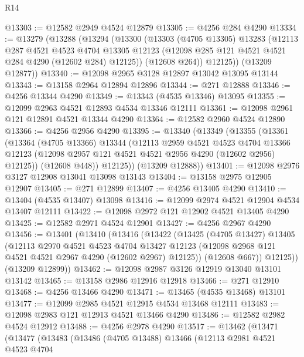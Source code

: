 \begin{lexlean}{R14}
\begin{coremodule}
@13303 := @12582 @2949 @4524 @12879
@13305 := @4256 @284 @4290
@13334 := @13279
    (@13288
      (@13294
        (@13300
          (@13303
            (@4705 @13305)
            @13283
            (@12113
              @287
              @4521
              @4523
              @4704
              @13305
              @12123
              (@12098 @285 @121 @4521 @4521 @284 @4290 (@12602 @284) @12125))
            (@12608 @264))
          @12125))
      (@13209 @12877))
@13340 := @12098 @2965 @3128 @12897 @13042 @13095 @13144
@13343 := @13158 @2964 @12894 @12896
@13344 := @271 @12888
@13346 := @4256 @13344 @4290
@13349 := @13343 (@4535 @13346) @13095
@13355 := @12099 @2963 @4521 @12893 @4534 @13346 @12111
@13361 := @12098 @2961 @121 @12891 @4521 @13344 @4290
@13364 := @12582 @2960 @4524 @12890
@13366 := @4256 @2956 @4290
@13395 := @13340
    (@13349
      (@13355
        (@13361
          (@13364
            (@4705 @13366)
            @13344
            (@12113
              @2959
              @4521
              @4523
              @4704
              @13366
              @12123
              (@12098 @2957 @121 @4521 @4521 @2956 @4290 (@12602 @2956) @12125))
            (@12608 @448))
          @12125))
      (@13209 @12888))
@13401 := @12098 @2976 @3127 @12908 @13041 @13098 @13143
@13404 := @13158 @2975 @12905 @12907
@13405 := @271 @12899
@13407 := @4256 @13405 @4290
@13410 := @13404 (@4535 @13407) @13098
@13416 := @12099 @2974 @4521 @12904 @4534 @13407 @12111
@13422 := @12098 @2972 @121 @12902 @4521 @13405 @4290
@13425 := @12582 @2971 @4524 @12901
@13427 := @4256 @2967 @4290
@13456 := @13401
    (@13410
      (@13416
        (@13422
          (@13425
            (@4705 @13427)
            @13405
            (@12113
              @2970
              @4521
              @4523
              @4704
              @13427
              @12123
              (@12098 @2968 @121 @4521 @4521 @2967 @4290 (@12602 @2967) @12125))
            (@12608 @667))
          @12125))
      (@13209 @12899))
@13462 := @12098 @2987 @3126 @12919 @13040 @13101 @13142
@13465 := @13158 @2986 @12916 @12918
@13466 := @271 @12910
@13468 := @4256 @13466 @4290
@13471 := @13465 (@4535 @13468) @13101
@13477 := @12099 @2985 @4521 @12915 @4534 @13468 @12111
@13483 := @12098 @2983 @121 @12913 @4521 @13466 @4290
@13486 := @12582 @2982 @4524 @12912
@13488 := @4256 @2978 @4290
@13517 := @13462
    (@13471
      (@13477
        (@13483
          (@13486
            (@4705 @13488)
            @13466
            (@12113
              @2981
              @4521
              @4523
              @4704

\end{coremodule}
\end{lexlean}
